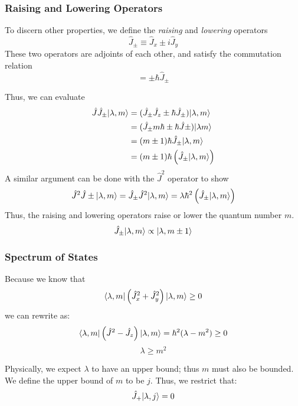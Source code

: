 \subsubsection{Raising and Lowering Operators}
To discern other properties, we define the \emph{raising} and \emph{lowering} operators
\begin{equation}
	\hat J_\pm \equiv \hat J_x \pm i\hat J_y\label{eq3:raiselower}
\end{equation}
These two operators are adjoints of each other, and satisfy the commutation relation
\begin{equation}
	[\hat J_z, \hat J_\pm]=\pm\hbar \hat J _\pm
\end{equation}

Thus, we can evaluate
\begin{align*}
	\hat J \hat J_\pm \lvert\lambda,m\rangle &= (\hat J_\pm \hat J_z\pm \hbar \hat J_\pm)\lvert\lambda, m\rangle\\
					&= (\hat J_\pm m\hbar \pm \hbar \hat J \pm)\lvert\lambda m\rangle\\
					&= (m\pm1)\hbar\hat J_\pm \lvert\lambda ,  m\rangle\\
					&= (m\pm 1)\hbar \left(\hat J_\pm \lvert\lambda, m\rangle\right)
\end{align*}
A similar argument can be done with the \(\hat J^2\) operator to show
\begin{equation}
	\hat J^2\hat J\pm \lvert\lambda, m\rangle = \hat J_\pm \hat J^2 \lvert\lambda, m\rangle= \lambda\hbar^2\left(\hat {J}_\pm \lvert\lambda, m\rangle\right)
\end{equation}
Thus, the raising and lowering operators raise or lower the quantum number \(m\). 
\begin{equation}
	\hat J_\pm \lvert\lambda,m\rangle \propto \lvert\lambda, m\pm1\rangle
\end{equation}

\subsubsection{Spectrum of States}
Because we know that
\[\langle\lambda, m\rvert \left(\hat J_x^2 + \hat J_y^2\right)\lvert\lambda, m\rangle\geq 0\]
we can rewrite as:
\[\langle\lambda, m\rvert\left(\hat J^2-\hat J_z\right)\lvert\lambda, m\rangle= \hbar^2(\lambda - m^2)\geq 0\]
\begin{equation}
	\lambda\geq m^2
\end{equation}

Physically, we expect \(\lambda\) to have an upper bound; thus \(m\) must also be bounded. We define the upper bound of \(m\) to be \(j\). Thus, we restrict that:
\begin{equation}
	\hat J_+ \lvert\lambda , j\rangle = 0
\end{equation}

